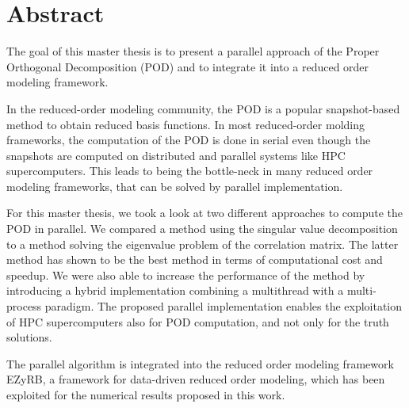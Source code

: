 \chapter*{Abstract}
The goal of this master thesis is to present a parallel approach of the Proper Orthogonal Decomposition (POD) and to integrate it into a reduced order modeling framework.

In the reduced-order modeling community, the POD is a popular snapshot-based method to obtain reduced basis functions.
In most reduced-order molding frameworks, the computation of the POD is done in serial even though the snapshots are computed on distributed and parallel systems like HPC supercomputers.
This leads to being the bottle-neck in many reduced order modeling frameworks, that can be solved by parallel implementation.

For this master thesis, we took a look at two different approaches to compute the POD in parallel. 
We compared a method using the singular value decomposition to a method solving the eigenvalue problem of the correlation matrix.
The latter method has shown to be the best method in terms of computational cost and speedup.
We were also able to increase the performance of the method by introducing a hybrid implementation combining a multithread with a multi-process paradigm.
The proposed parallel implementation enables the exploitation of HPC supercomputers also for POD computation, and not only for the truth solutions.


The parallel algorithm is integrated into the reduced order modeling framework EZyRB, a framework for data-driven reduced order modeling, which has been exploited for the numerical results proposed in this work.



 